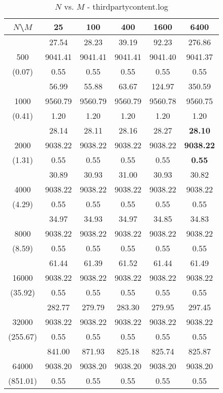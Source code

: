 \documentclass[conference]{IEEEtran}
\begin{document}
\begin{table}[th]
\caption{$N$ vs. $M$ - thirdpartycontent.log}
\label{tab:thirdpartycontent.log}
\centering
\begin{tabular}{|c||c|c|c|c|c|}
\hline
$N$\textbackslash $M$ & 25 & 100 & 400 & 1600 & 6400 \\ \hline \hline
  & 27.54 & 28.23 & 39.19 & 92.23 & 276.86\\ 
500  & 9041.41 & 9041.41 & 9041.41 & 9041.40 & 9041.37\\ 
(0.07)  & 0.55 & 0.55 & 0.55 & 0.55 & 0.55\\ \hline 
  & 56.99 & 55.88 & 63.67 & 124.97 & 350.59\\ 
1000  & 9560.79 & 9560.79 & 9560.79 & 9560.78 & 9560.75\\ 
(0.41)  & 1.20 & 1.20 & 1.20 & 1.20 & 1.20\\ \hline 
  & 28.14 & 28.11 & 28.16 & 28.27 & {\bf 28.10}\\ 
2000  & 9038.22 & 9038.22 & 9038.22 & 9038.22 & {\bf 9038.22}\\ 
(1.31)  & 0.55 & 0.55 & 0.55 & 0.55 & {\bf 0.55}\\ \hline 
  & 30.89 & 30.93 & 31.00 & 30.93 & 30.82\\ 
4000  & 9038.22 & 9038.22 & 9038.22 & 9038.22 & 9038.22\\ 
(4.29)  & 0.55 & 0.55 & 0.55 & 0.55 & 0.55\\ \hline 
  & 34.97 & 34.93 & 34.97 & 34.85 & 34.83\\ 
8000  & 9038.22 & 9038.22 & 9038.22 & 9038.22 & 9038.22\\ 
(8.59)  & 0.55 & 0.55 & 0.55 & 0.55 & 0.55\\ \hline 
  & 61.44 & 61.39 & 61.52 & 61.44 & 61.49\\ 
16000  & 9038.22 & 9038.22 & 9038.22 & 9038.22 & 9038.22\\ 
(35.92)  & 0.55 & 0.55 & 0.55 & 0.55 & 0.55\\ \hline 
  & 282.77 & 279.79 & 283.30 & 279.95 & 297.45\\ 
32000  & 9038.22 & 9038.22 & 9038.22 & 9038.22 & 9038.22\\ 
(255.67)  & 0.55 & 0.55 & 0.55 & 0.55 & 0.55\\ \hline 
  & 841.00 & 871.93 & 825.18 & 825.74 & 825.87\\ 
64000  & 9038.20 & 9038.20 & 9038.20 & 9038.20 & 9038.20\\ 
(851.01)  & 0.55 & 0.55 & 0.55 & 0.55 & 0.55\\ \hline 
\end{tabular}
\end{table}
\end{document}
